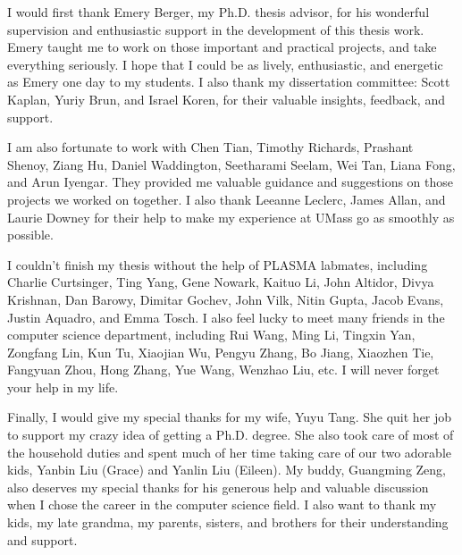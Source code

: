 I would first thank Emery Berger, my Ph.D. thesis advisor, for his wonderful supervision and enthusiastic support in the development of this thesis work. Emery taught me to work on those important and practical projects, and take everything seriously. I hope that I could be as lively, enthusiastic, and energetic as Emery one day to my students. I also thank my dissertation committee: Scott Kaplan, Yuriy Brun, and Israel Koren, for their valuable insights, feedback, and support. 

I am also fortunate to work with Chen Tian, Timothy Richards, Prashant Shenoy, Ziang Hu, Daniel Waddington, Seetharami Seelam, Wei Tan, Liana Fong, and Arun Iyengar. They provided me valuable guidance and suggestions on those projects we worked on together. I also thank Leeanne Leclerc, James Allan, and Laurie Downey for their help to make my experience at UMass go as smoothly as possible. 

I couldn't finish my thesis without the help of PLASMA  labmates, including Charlie Curtsinger, Ting Yang, Gene Nowark, Kaituo Li, John Altidor, Divya Krishnan, Dan Barowy, Dimitar Gochev, John Vilk, Nitin Gupta, Jacob Evans, Justin Aquadro, and Emma Tosch. I also feel lucky to meet many friends in the computer science department, including Rui Wang, Ming Li, Tingxin Yan, Zongfang Lin, Kun Tu, Xiaojian Wu, Pengyu Zhang, Bo Jiang, Xiaozhen Tie, Fangyuan Zhou, Hong Zhang, Yue Wang, Wenzhao Liu, etc. I will never forget your help in my life. 

Finally, I would give my special thanks for my wife, Yuyu Tang. She quit her job to support my crazy idea of getting a Ph.D. degree. She also took care of most of the household duties and spent much of her time taking care of our two adorable kids, Yanbin Liu (Grace) and Yanlin Liu (Eileen). My buddy, Guangming Zeng, also deserves my special thanks for his generous help and valuable discussion when I chose the career in the computer science field. I also want to thank my kids, my late grandma, my parents, sisters, and brothers for their understanding and support.    

